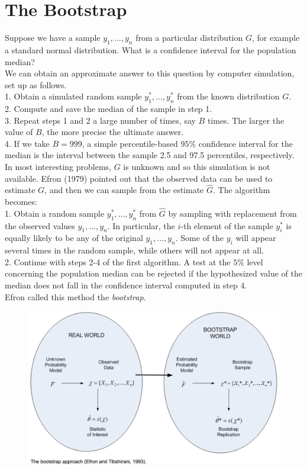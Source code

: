 \documentclass[14pt]{extarticle}
\begin{document}
\section*{The Bootstrap}
\noindent
Suppose we have a sample \( y_1, \dots, y_n \) from a particular distribution \( G \), for example a standard normal distribution. What is a confidence interval for the population median?\\
We can obtain an approximate answer to this question by computer simulation, set up as follows.\\
1. Obtain a simulated random sample \( y_1^*, \dots, y_n^* \) from the known distribution \( G \).\\
2. Compute and save the median of the sample in step 1.\\
3. Repeat steps 1 and 2 a large number of times, say \( B \) times. The larger the value of \( B \), the more precise the ultimate answer.\\
4. If we take \( B = 999 \), a simple percentile-based \( 95\% \) confidence interval for the median is the interval between the sample 2.5 and 97.5 percentiles, respectively.\\
In most interesting problems, \( G \) is unknown and so this simulation is not available. Efron (1979) pointed out that the observed data can be used to estimate \( G \), and then we can sample from the estimate \( \hat{G} \). The algorithm becomes:\\
1. Obtain a random sample \( y_1^*, \ldots, y_n^* \) from \( \hat{G} \) by sampling with replacement from the observed values \( y_1, \ldots, y_n \). In particular, the \( i \)-th element of the sample \( y_i^* \) is equally likely to be any of the original \( y_1, \ldots, y_n \). Some of the \( y_i \) will appear several times in the random sample, while others will not appear at all.\\
2. Continue with steps 2-4 of the first algorithm. A test at the \( 5\% \) level concerning the population median can be rejected if the hypothesized value of the median does not fall in the confidence interval computed in step 4.\\
Efron called this method the \textit{bootstrap}.
\begin{figure}[H]
    \centering
    \includegraphics[width=1\textwidth]{fig15.png}
\end{figure} 
\end{document}
